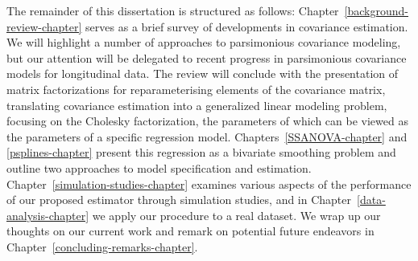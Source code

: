 The remainder of this dissertation is structured as follows: Chapter~\ref{background-review-chapter} serves as a brief survey of developments in covariance estimation.  We will highlight a number of approaches to parsimonious covariance modeling, but our attention will be delegated to recent progress in parsimonious covariance models for longitudinal data. The review will conclude with the presentation of matrix factorizations for reparameterising elements of the covariance matrix, translating covariance estimation into a generalized linear modeling problem, focusing on the Cholesky factorization, the parameters of which can be viewed as the parameters of a specific regression model. Chapters~\ref{SSANOVA-chapter} and \ref{psplines-chapter} present this regression as a bivariate smoothing problem and outline two approaches to model specification and estimation. Chapter~\ref{simulation-studies-chapter} examines various aspects of the performance of our proposed estimator through simulation studies, and in Chapter~\ref{data-analysis-chapter} we apply our procedure to a real dataset. We wrap up our thoughts on our current work and remark on potential future endeavors in Chapter~\ref{concluding-remarks-chapter}. 

